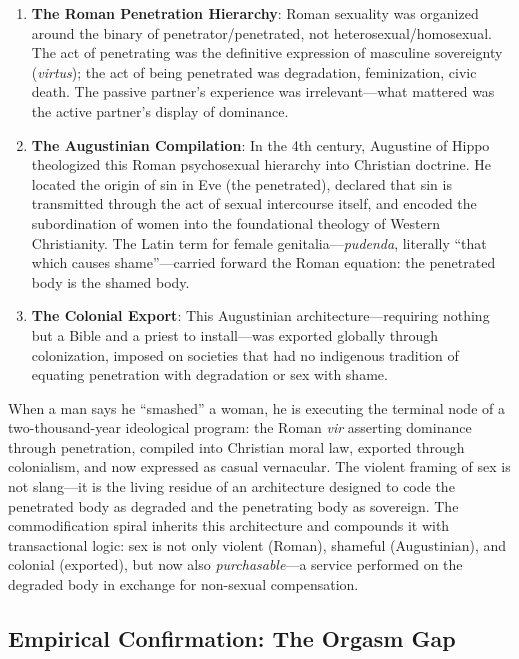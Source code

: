 \documentclass[12pt,openany]{book}
\numberwithin{equation}{chapter}
\begin{document}
\begin{enumerate}
    \item \textbf{The Roman Penetration Hierarchy}: Roman sexuality was organized around the binary of penetrator/penetrated, not heterosexual/homosexual. The act of penetrating was the definitive expression of masculine sovereignty (\textit{virtus}); the act of being penetrated was degradation, feminization, civic death. The passive partner's experience was irrelevant---what mattered was the active partner's display of dominance.
    
    \item \textbf{The Augustinian Compilation}: In the 4th century, Augustine of Hippo theologized this Roman psychosexual hierarchy into Christian doctrine. He located the origin of sin in Eve (the penetrated), declared that sin is transmitted through the act of sexual intercourse itself, and encoded the subordination of women into the foundational theology of Western Christianity. The Latin term for female genitalia---\textit{pudenda}, literally ``that which causes shame''---carried forward the Roman equation: the penetrated body is the shamed body.
    
    \item \textbf{The Colonial Export}: This Augustinian architecture---requiring nothing but a Bible and a priest to install---was exported globally through colonization, imposed on societies that had no indigenous tradition of equating penetration with degradation or sex with shame.
\end{enumerate}

When a man says he ``smashed'' a woman, he is executing the terminal node of a two-thousand-year ideological program: the Roman \textit{vir} asserting dominance through penetration, compiled into Christian moral law, exported through colonialism, and now expressed as casual vernacular. The violent framing of sex is not slang---it is the living residue of an architecture designed to code the penetrated body as degraded and the penetrating body as sovereign. The commodification spiral inherits this architecture and compounds it with transactional logic: sex is not only violent (Roman), shameful (Augustinian), and colonial (exported), but now also \textit{purchasable}---a service performed on the degraded body in exchange for non-sexual compensation.

\subsection{Empirical Confirmation: The Orgasm Gap}
\end{document}
